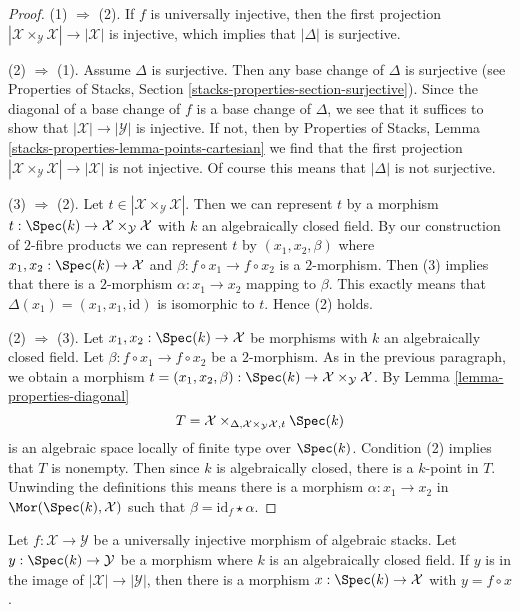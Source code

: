 \begin{proof}
(1) $\Rightarrow$ (2). If $f$ is universally injective, then the
first projection
$|\mathcal{X} \times_\mathcal{Y} \mathcal{X}| \to |\mathcal{X}|$
is injective, which implies that $|\Delta|$ is surjective.

\medskip\noindent
(2) $\Rightarrow$ (1). Assume $\Delta$ is surjective. Then any base change
of $\Delta$ is surjective (see Properties of Stacks, Section
\ref{stacks-properties-section-surjective}).
Since the diagonal of a base change
of $f$ is a base change of $\Delta$, we see that it suffices
to show that $|\mathcal{X}| \to |\mathcal{Y}|$ is injective.
If not, then by Properties of Stacks, Lemma
\ref{stacks-properties-lemma-points-cartesian}
we find that the first projection
$|\mathcal{X} \times_\mathcal{Y} \mathcal{X}| \to |\mathcal{X}|$
is not injective. Of course this means that $|\Delta|$ is not
surjective.

\medskip\noindent
(3) $\Rightarrow$ (2). Let
$t \in |\mathcal{X} \times_\mathcal{Y} \mathcal{X}|$.
Then we can represent $t$ by a morphism
$t : \Spec(k) \to \mathcal{X} \times_\mathcal{Y} \mathcal{X}$
with $k$ an algebraically closed field.
By our construction of $2$-fibre products we can represent
$t$ by $(x_1, x_2, \beta)$ where $x_1, x_2 : \Spec(k) \to \mathcal{X}$
and $\beta : f \circ x_1 \to f \circ x_2$ is a $2$-morphism.
Then (3) implies that there is a $2$-morphism
$\alpha : x_1 \to x_2$ mapping to $\beta$.
This exactly means that $\Delta(x_1) = (x_1, x_1, \text{id})$
is isomorphic to $t$. Hence (2) holds.

\medskip\noindent
(2) $\Rightarrow$ (3). Let $x_1, x_2 : \Spec(k) \to \mathcal{X}$
be morphisms with $k$ an algebraically closed field. Let
$\beta : f \circ x_1 \to f \circ x_2$ be a $2$-morphism.
As in the previous paragraph, we obtain a morphism
$t = (x_1, x_2, \beta) :
\Spec(k) \to \mathcal{X} \times_\mathcal{Y} \mathcal{X}$.
By Lemma \ref{lemma-properties-diagonal}
$$
T = \mathcal{X}
\times_{\Delta, \mathcal{X} \times_\mathcal{Y} \mathcal{X}, t} \Spec(k)
$$
is an algebraic space locally of finite type over $\Spec(k)$.
Condition (2) implies that $T$ is nonempty. Then since $k$ is
algebraically closed, there is a $k$-point in $T$.
Unwinding the definitions this means there is a morphism
$\alpha : x_1 \to x_2$ in $\Mor(\Spec(k), \mathcal{X})$
such that $\beta = \text{id}_f \star \alpha$.
\end{proof}

\begin{lemma}
\label{lemma-universally-injective-point}
Let $f : \mathcal{X} \to \mathcal{Y}$ be a universally injective
morphism of algebraic stacks. Let $y : \Spec(k) \to \mathcal{Y}$
be a morphism where $k$ is an algebraically closed field.
If $y$ is in the image of $|\mathcal{X}| \to |\mathcal{Y}|$,
then there is a morphism $x : \Spec(k) \to \mathcal{X}$
with $y = f \circ x$.
\end{lemma}

